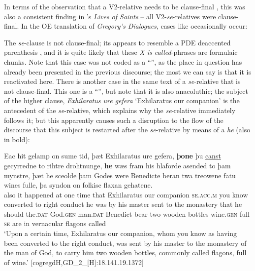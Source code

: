 \documentclass[output=paper,colorlinks,citecolor=brown]{langscibook}
\begin{document}
In terms of the observation that a  V2-relative needs to be clause-final \citep[100]{Gärtner2001}, this was also a consistent finding in 's \textit{Lives of Saints} – all V2-\textit{se}{}-relatives were clause-final. In the OE translation of \textit{Gregory's Dialogues}, cases like  occasionally occur:

\z

The \textit{se}{}-clause is not clause-final; its appears to resemble a PDE deaccented parenthesis \citep[cf.][102]{Gärtner2001}, and it is quite likely that these \textit{X is called}{}-phrases are formulaic chunks. Note that this case was not coded as a “”, as the place in question has already been presented in the previous discourse; the most we can say is that it is reactivated here. There is another case in the same text of a \textit{se}{}-relative that is not clause-final. This one is a “”, but note that it is also anacoluthic; the subject of the higher clause, \textit{Exhilaratus ure gefera} ‘Exhilaratus our companion' is the antecedent of the \textit{se}{}-relative, which explains why the \textit{se}{}-relative immediately follows it; but this apparently causes such a disruption to the flow of the discourse that this subject is restarted after the \textit{se}{}-relative by means of a  \textit{he} (also in bold):

 \ea\label{ex:los:23}
 \gll Eac hit gelamp on sume tid, þæt Exhilaratus ure gefera, \textbf{þone} þu \underline{canst} gecyrredne to rihtre drohtnunge, \textbf{he} wæs fram his hlaforde asended to þam mynstre, þæt he sceolde þam Godes were Benedicte beran twa treowene fatu wines fulle, þa syndon on folkisc flaxan gehatene.\\
also it happened at one time that Exhilaratus our companion \textsc{se.acc.m} you know converted to right conduct he was by his master sent to the monastery that he should the.\textsc{dat} God.\textsc{gen} man.\textsc{dat} Benedict bear two wooden bottles wine.\textsc{gen} \textup{full} \textsc{se} are in vernacular flagons called\\
\glt ‘Upon a certain time, Exhilaratus our companion, whom you know as having been converted to the right conduct, was sent by his master to the monastery of the man of God, to carry him two wooden bottles, commonly called flagons, full of wine.' \hfill [cogregdH,GD\_2\_[H]:18.141.19.1372]
\z
\end{document}
